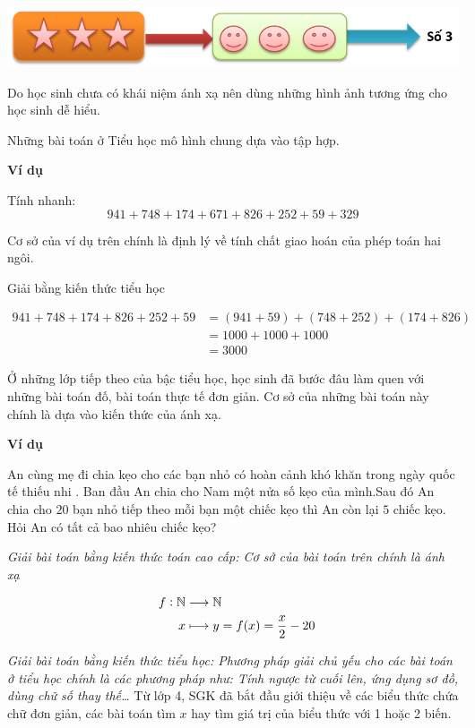 \documentclass[12pt,oneside,a4paper,reqno]{book}
\begin{document}
\includegraphics[scale=.6]{hinh8}

\medskip
Do học sinh chưa có khái niệm ánh xạ nên dùng những hình ảnh tương ứng cho học sinh dễ hiểu.

\medskip
 Những bài toán ở Tiểu học mô hình chung dựa vào tập hợp.
 
{\bf Ví dụ}

Tính nhanh:     $$941+748+174+671+826+252+59+329$$

 Cơ sở của ví dụ trên chính là định lý về tính chất giao hoán của phép toán hai ngôi.

Giải bằng kiến thức tiểu học

\begin{align*}
941+748+174+826+252+59 &=(941+59) + (748+252) + (174+826) \\ 
 &= 1000+1000+1000\\ 
 &= 3000
\end{align*}


Ở những lớp tiếp theo của bậc tiểu học, học sinh đã bước đâu làm quen với những bài toán đố, bài toán thực tế đơn giản. Cơ sở của những bài toán này chính là dựa vào kiến thức của ánh xạ.

{\bf Ví dụ}

An cùng mẹ đi chia kẹo cho các bạn nhỏ có hoàn cảnh khó khăn trong ngày quốc tế thiếu nhi . Ban đầu An chia cho Nam một nửa số kẹo của mình.Sau đó An chia cho $20$ bạn nhỏ tiếp theo mỗi bạn một chiếc kẹo thì An còn lại $5$ chiếc kẹo. Hỏi An có tất cả bao nhiêu chiếc kẹo?


    \textit{Giải bài toán bằng kiến thức toán cao cấp: Cơ sở của bài toán trên chính là ánh xạ}
    
\begin{align*}
\text{ \space}f:\mathbb{N}&\longrightarrow\mathbb{N}\\
x&\longmapsto y=f(x)=\frac{x}{2}-20
\end{align*}

\medskip
\textit{Giải bài toán bằng kiến thức tiểu học: Phương pháp giải chủ yếu cho các bài toán ở tiểu học chính là các phương pháp như: Tính ngược từ cuối lên, ứng dụng sơ đồ, dùng chữ số thay thế…}
\medskip
Từ lớp 4, SGK đã bắt đầu giới thiệu về các biểu thức chứa chữ đơn giản, các bài toán tìm $x$ hay tìm giá trị của biểu thức với 1 hoặc 2 biến.
 
\end{document}
